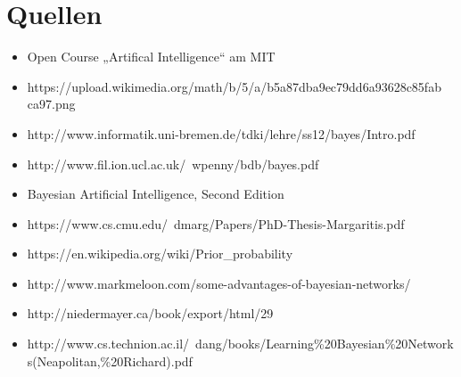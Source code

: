 \section{Quellen}
\begin{itemize}
\item Open Course „Artifical Intelligence“ am MIT
\item https://upload.wikimedia.org/math/b/5/a/b5a87dba9ec79dd6a93628c85fab ca97.png
\item http://www.informatik.uni-bremen.de/tdki/lehre/ss12/bayes/Intro.pdf
\item http://www.fil.ion.ucl.ac.uk/~wpenny/bdb/bayes.pdf
\item Bayesian Artificial Intelligence, Second Edition
\item https://www.cs.cmu.edu/~dmarg/Papers/PhD-Thesis-Margaritis.pdf
\item https://en.wikipedia.org/wiki/Prior\_probability
\item http://www.markmeloon.com/some-advantages-of-bayesian-networks/
\item http://niedermayer.ca/book/export/html/29
\item http://www.cs.technion.ac.il/~dang/books/Learning\%20Bayesian\%20Networks(Neapolitan,\%20Richard).pdf
\end{itemize}
